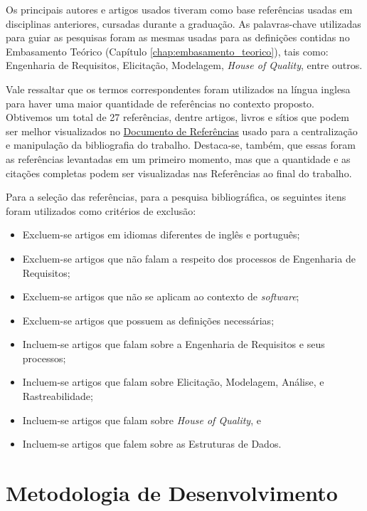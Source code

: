 Os principais autores e artigos usados tiveram como base referências usadas em disciplinas anteriores, cursadas durante a graduação. As palavras-chave utilizadas para guiar as pesquisas foram as mesmas usadas para as definições contidas no Embasamento Teórico (Capítulo \ref{chap:embasamento_teorico}), tais como: Engenharia de Requisitos, Elicitação, Modelagem, \textit{House of Quality}, entre outros.

Vale ressaltar que os termos correspondentes foram utilizados na língua inglesa para haver uma maior quantidade de referências no contexto proposto. Obtivemos um total de 27 referências, dentre artigos, livros e sítios que podem ser melhor visualizados no \href{https://unb-rogerio.notion.site/Refer-ncias-c31bfce5dba543619a9d0913f4ba9a00}{Documento de Referências} usado para a centralização e manipulação da bibliografia do trabalho. Destaca-se, também, que essas foram as referências levantadas em um primeiro momento, mas que a quantidade e as citações completas podem ser visualizadas nas Referências ao final do trabalho.

Para a seleção das referências, para a pesquisa bibliográfica, os seguintes itens foram utilizados como critérios de exclusão:

\begin{itemize}
    \item Excluem-se artigos em idiomas diferentes de inglês e português;
    \item Excluem-se artigos que não falam a respeito dos processos de Engenharia de Requisitos;
    \item Excluem-se artigos que não se aplicam ao contexto de \textit{software};
    \item Excluem-se artigos que possuem as definições necessárias;
    \item Incluem-se artigos que falam sobre a Engenharia de Requisitos e seus processos;
    \item Incluem-se artigos que falam sobre Elicitação, Modelagem, Análise, e Rastreabilidade;
    \item Incluem-se artigos que falam sobre \textit{House of Quality}, e
    \item Incluem-se artigos que falem sobre as Estruturas de Dados.
\end{itemize}

\section{Metodologia de Desenvolvimento}

